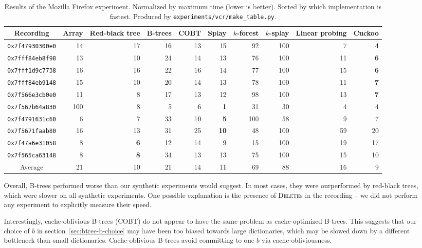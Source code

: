 \begin{table}
\centering
\begin{tabular}{|c|r|r|r|r|r|r|r|r|r|}
	\hline
	Recording &
		Array & Red-black tree &
		B-trees & COBT &
		Splay & $k$-forest & $k$-splay &
		Linear probing & Cuckoo \\
	\hline
	\texttt{0x7f47930300e0} & 14 & 17 & 16 & 13 & 15 & 92 & 100 & 7 & \textbf{4} \\
	\hline
	\texttt{0x7fff84eb8f98} & 13 & 10 & 24 & 14 & 13 & 76 & 100 & 11 & \textbf{6} \\
	\hline
	\texttt{0x7fff1d9c7738} & 16 & 16 & 22 & 16 & 14 & 77 & 100 & 15 & \textbf{6} \\
	\hline
	\texttt{0x7fff84eb9148} & 15 & 10 & 20 & 14 & 13 & 78 & 100 & 11 & \textbf{7} \\
	\hline
	\texttt{0x7f566e3cb0e0} & 11 & 8 & 17 & 13 & 12 & 98 & 100 & 13 & \textbf{7} \\
	\hline
	\texttt{0x7f567b64a830} & 100 & 8 & 5 & 6 & \textbf{1} & 31 & 30 & 4 & 4 \\
	\hline
	\texttt{0x7f4791631c60} & 6 & 7 & 33 & 10 & \textbf{5} & 100 & 58 & 9 & 7 \\
	\hline
	\texttt{0x7f5671faab80} & 16 & 13 & 31 & 25 & \textbf{10} & 48 & 100 & 59 & 20 \\
	\hline
	\texttt{0x7f47a6e31058} & 8 & \textbf{6} & 12 & 14 & 9 & 15 & 100 & 19 & 17 \\
	\hline
	\texttt{0x7f565ca63148} & 8 & \textbf{8} & 34 & 13 & 13 & 75 & 100 & 15 & 10 \\
	\hline
	\hline
	Average & 21 & 10 & 21 & 14 & 11 & 69 & 88 & 16 & 9 \\
	\hline
\end{tabular}
\caption{Results of the Mozilla Firefox experiment. Normalized by maximum
	time (lower is better). Sorted by which implementation is fastest.
	Produced by \texttt{experiments/vcr/make\_table.py}.}
\label{tab:firefox-results}
\end{table}

Overall, \mbox{B-trees} performed worse than our synthetic experiments would
suggest. In most cases, they were ourperformed by red-black trees, which
were slower on all synthetic experiments.
One possible explanation is the presence of \textsc{Delete}s in the recording --
we did not perform any experiment to explicitly measure their speed.

Interestingly, cache-oblivious B-trees (COBT) do not appear to have the same
problem as cache-optimized \mbox{B-trees}. This suggests that our choice
of $b$ in section~\ref{sec:btree-b-choice} may have been too biased towards
large dictionaries, which may be slowed down by a different bottleneck
than small dictionaries. Cache-oblivious B-trees avoid committing to one
$b$ via cache-obliviousness.

